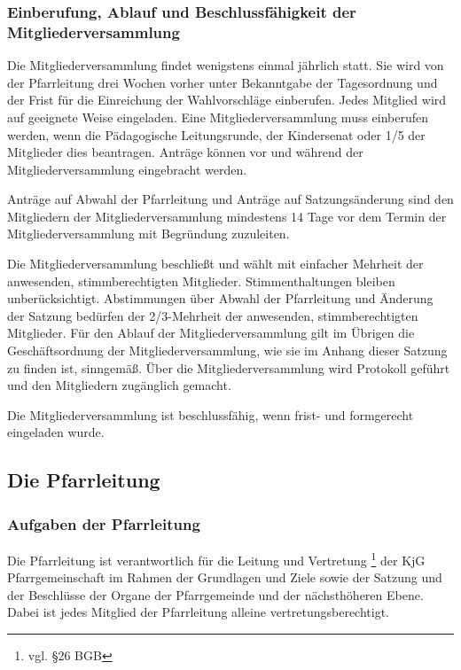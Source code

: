 \documentclass[12pt]{report}
\begin{document}
\begin{justify}
\subsubsection{Einberufung, Ablauf und Beschlussfähigkeit der Mitgliederversammlung}
Die Mitgliederversammlung findet wenigstens einmal jährlich statt. Sie wird von der Pfarrleitung
drei Wochen vorher unter Bekanntgabe der Tagesordnung und der Frist für die Einreichung
der Wahlvorschläge einberufen. Jedes Mitglied wird auf geeignete Weise eingeladen.
Eine Mitgliederversammlung muss einberufen werden, wenn die Pädagogische Leitungsrunde,
der Kindersenat oder 1/5 der Mitglieder dies beantragen. Anträge können vor und während der 
Mitgliederversammlung eingebracht werden.

Anträge auf Abwahl der Pfarrleitung und Anträge auf Satzungsänderung sind den Mitgliedern
der Mitgliederversammlung mindestens 14 Tage vor dem Termin der Mitgliederversammlung mit
Begründung zuzuleiten.

Die Mitgliederversammlung beschließt und wählt mit einfacher Mehrheit der anwesenden, stimmberechtigten Mitglieder.
Stimmenthaltungen bleiben unberücksichtigt. Abstimmungen über
Abwahl der Pfarrleitung und Änderung der Satzung bedürfen der 2/3-Mehrheit der anwesenden,
stimmberechtigten Mitglieder. Für den Ablauf der Mitgliederversammlung gilt im
Übrigen die Geschäftsordnung der Mitgliederversammlung, wie sie im Anhang dieser Satzung zu finden ist, sinngemäß. Über die Mitgliederversammlung
wird Protokoll geführt und den Mitgliedern zugänglich gemacht.

Die Mitgliederversammlung ist beschlussfähig, wenn frist- und formgerecht eingeladen wurde.
\subsection{Die Pfarrleitung}
\subsubsection{Aufgaben der Pfarrleitung}
Die Pfarrleitung ist verantwortlich für die Leitung und Vertretung \footnote{ vgl. §26 BGB} der KjG Pfarrgemeinschaft im Rahmen der Grundlagen und Ziele sowie der Satzung und der Beschlüsse der Organe der Pfarrgemeinde und der nächsthöheren Ebene. Dabei ist jedes Mitglied der Pfarrleitung alleine vertretungsberechtigt.


\end{justify}
\end{document}
